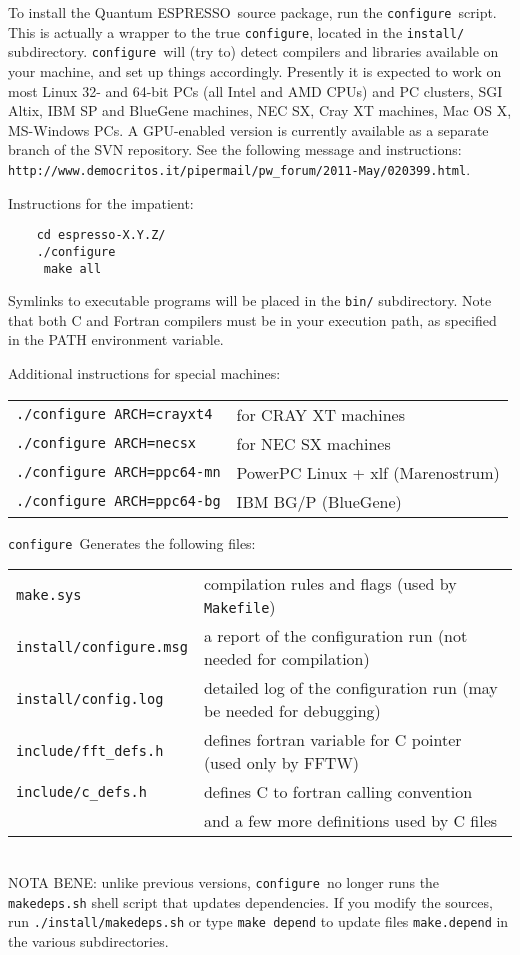 \documentclass[12pt,a4paper]{article}
\def\qe{{\sc Quantum ESPRESSO}}
\def\configure{\texttt{configure}}
\begin{document}
To install the \qe\ source package, run the \configure{}ript. This is actually a wrapper to the true \configure,
located in the \texttt{install/} subdirectory. \configure\
will (try to) detect compilers and libraries available on
your machine, and set up things accordingly. Presently it is expected
to work on most Linux 32- and 64-bit PCs (all Intel and AMD CPUs) and 
PC clusters, SGI Altix, IBM SP and BlueGene machines, NEC SX, Cray XT
machines, Mac OS X, MS-Windows PCs. A GPU-enabled version is currently
available as a separate branch of the SVN repository. See the following 
message and instructions:\\
\texttt{http://www.democritos.it/pipermail/pw\_forum/2011-May/020399.html}.

Instructions for the impatient:
\begin{verbatim}
    cd espresso-X.Y.Z/
    ./configure
     make all
\end{verbatim}
Symlinks to executable programs will be placed in the
\texttt{bin/}
subdirectory. Note that both C and Fortran compilers must be in your execution
path, as specified in the PATH environment variable.

Additional instructions for special machines:

\begin{tabular}{ll}
    \texttt{./configure ARCH=crayxt4}& for CRAY XT machines \\
    \texttt{./configure ARCH=necsx}   & for NEC SX machines \\
    \texttt{./configure ARCH=ppc64-mn}& PowerPC Linux + xlf (Marenostrum) \\
    \texttt{./configure ARCH=ppc64-bg}& IBM BG/P (BlueGene)
\end{tabular}
    
\configure\ Generates the following files:

\begin{tabular}{ll}
\texttt{make.sys} &      compilation rules and flags (used by \texttt{Makefile})\\
\texttt{install/configure.msg} & a report of the configuration run (not needed for compilation)\\
\texttt{install/config.log} & detailed log of the configuration run (may be needed for debugging)\\
\texttt{include/fft\_defs.h} &    defines fortran variable for C pointer (used only by FFTW)\\
\texttt{include/c\_defs.h} &      defines C to fortran calling convention\\
                           & and a few more definitions used by C files\\
\end{tabular}\\
NOTA BENE: unlike previous versions, \configure\ no longer runs the 
\texttt{makedeps.sh} shell script that updates dependencies. If you modify the  
sources, run \texttt{./install/makedeps.sh} or type \texttt{make depend}
to update files \texttt{make.depend} in the various subdirectories.
    
\end{document}
